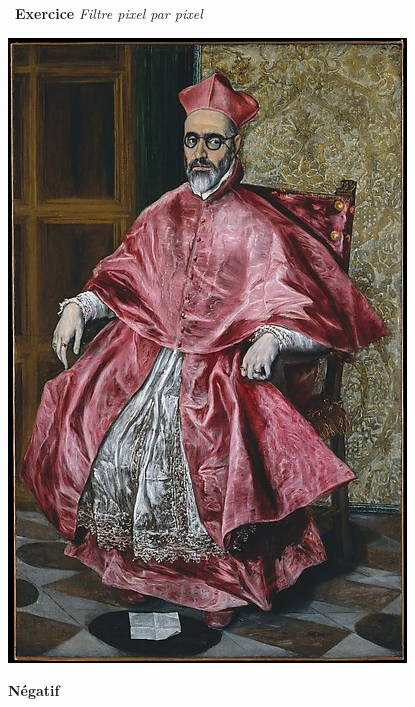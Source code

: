 \documentclass[a4paper, french, 12pt]{article}
\newcounter{exo}
\newenvironment{exercice}[1]
{\par \medskip   \addtocounter{exo}{1} \noindent  
\begin{bclogo}[arrondi =0.1,   noborder = true, logo=\bccrayon, marge=4]{~\textbf{Exercice} \textbf{\theexo} {\itshape #1} }  \par}
{
\end{bclogo}
 \par \bigskip }
\begin{document}
\begin{exercice}{Filtre pixel par pixel}
\begin{enumerate}
\begin{minipage}{0.45\linewidth}
\begin{center}
\includegraphics[scale=0.5]{images/cardinal.jpg}
\end{center}
\end{minipage}\hfill
\begin{minipage}{0.45\linewidth}
\begin{center}
\textbf{Négatif}


\end{center}
\end{minipage}
\end{enumerate}
\end{exercice}
\end{document}
